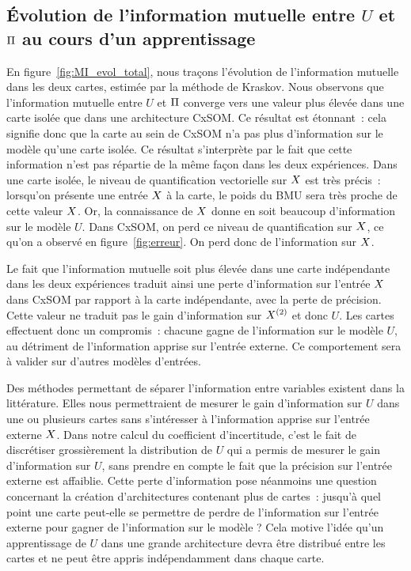 \documentclass[../main]{subfiles}
\begin{document}
\subsection{\'Evolution de l'information mutuelle entre $U$ et $\Pi$ au cours d'un apprentissage}

En figure~\ref{fig:MI_evol_total}, nous traçons l'évolution de l'information mutuelle dans les deux cartes, estimée par la méthode de Kraskov. 
Nous observons que l'information mutuelle entre $U$ et $\Pi$ converge vers une valeur plus élevée dans une carte isolée que dans une architecture CxSOM.
Ce résultat est étonnant~: cela signifie donc que la carte au sein de CxSOM n'a pas plus d'information sur le modèle qu'une carte isolée. 
Ce résultat s'interprète par le fait que cette information n'est pas répartie de la même façon dans les deux expériences.
Dans une carte isolée, le niveau de quantification vectorielle sur $X$ est très précis~: lorsqu'on présente une entrée $X$ à la carte, le poids du BMU sera très proche de cette valeur $X$. Or, la connaissance de $X$ donne en soit beaucoup d'information sur le modèle $U$.
Dans CxSOM, on perd ce niveau de quantification sur $X$, ce qu'on a observé en figure~\ref{fig:erreur}. On perd donc de l'information sur $X$.

Le fait que l'information mutuelle soit plus élevée dans une carte indépendante dans les deux expériences traduit ainsi une perte d'information sur l'entrée $X$ dans CxSOM par rapport à la carte indépendante, avec la perte de précision. Cette valeur ne traduit pas le gain d'information sur $X^{({2})}$ et donc $U$.
Les cartes effectuent donc un compromis~: chacune gagne de l'information sur le modèle $U$, au détriment de l'information apprise sur l'entrée externe. Ce comportement sera à valider sur d'autres modèles d'entrées.


Des méthodes permettant de séparer l'information entre variables existent dans la littérature. Elles nous permettraient de mesurer le gain d'information sur $U$ dans une ou plusieurs cartes sans s'intéresser à l'information apprise sur l'entrée externe $X$.
Dans notre calcul du coefficient d'incertitude, c'est le fait de discrétiser grossièrement la distribution de $U$ qui a permis de mesurer le gain d'information sur $U$, sans prendre en compte le fait que la précision sur l'entrée externe est affaiblie.
Cette perte d'information pose néanmoins une question concernant la création d'architectures contenant plus de cartes~: jusqu'à quel point une carte peut-elle se permettre de perdre de l'information sur l'entrée externe pour gagner de l'information sur le modèle ? 
Cela motive l'idée qu'un apprentissage de $U$ dans une grande architecture devra être distribué entre les cartes et ne peut être appris indépendamment dans chaque carte.
\end{document}
